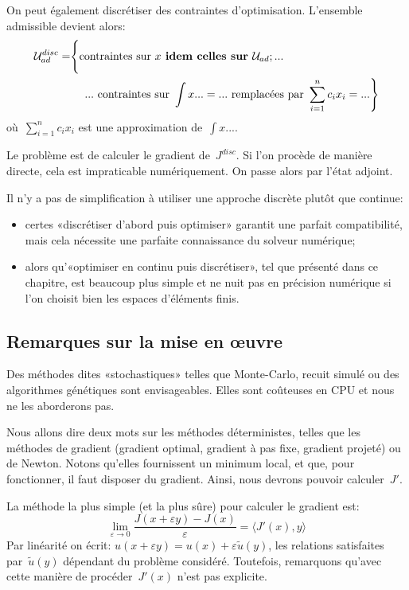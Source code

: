 On peut également discrétiser des contraintes d'optimisation. L'ensemble admissible devient alors:
\begin{equation}
\begin{split} 
\mathcal{U}^{disc}_{ad} = &\Bigg\{ \text{contraintes sur } x \textbf{ idem celles sur } \mathcal{U}_{ad}; ...\\  
& \left. \quad ... \text{ contraintes sur } \int x...=... \text{ remplacées par } \displaystyle\sum_{i=1}^n c_ix_i = ... \right\}
\end{split}
\end{equation}
où~$\sum_{i=1}^n c_ix_i$ est une approximation de~$\int x...$.

Le problème est de calculer le gradient de~$J^{disc}$. Si l'on procède de manière directe, cela est impraticable numériquement. On passe alors par l'état adjoint.

\medskip
Il n'y a pas de simplification à utiliser une approche discrète plutôt que continue:
\begin{itemize}
   \item certes «discrétiser d'abord puis optimiser» garantit une parfait compatibilité, mais cela nécessite une parfaite connaissance du solveur numérique;
   \item alors qu'«optimiser en continu puis discrétiser», tel que présenté dans ce chapitre, est beaucoup plus simple et ne nuit pas en précision numérique si l'on choisit bien les espaces d'éléments finis.
\end{itemize}


\medskip
\subsection{Remarques sur la mise en œuvre}

Des méthodes dites «stochastiques» telles que Monte-Carlo, recuit simulé ou des algorithmes génétiques sont envisageables. Elles sont coûteuses en CPU et nous ne les aborderons pas.

Nous allons dire deux mots sur les méthodes déterministes, telles que les méthodes de gradient (gradient optimal, gradient à pas fixe, gradient projeté) ou de Newton. Notons qu'elles fournissent un minimum local, et que, pour fonctionner, il faut disposer du gradient. Ainsi, nous devrons pouvoir calculer~$J'$.

\medskip
La méthode la plus simple (et la plus sûre) pour calculer le gradient est:
\begin{equation}
\lim_{\varepsilon\rightarrow0} \dfrac{J(x+\varepsilon y)-J(x)}{\varepsilon}
=\langle J'(x),y\rangle %
\end{equation}
Par linéarité on écrit: $u(x+\varepsilon y)=u(x)+\varepsilon \tilde{u}(y)$, les relations satisfaites par~$\tilde{u}(y)$ dépendant du problème considéré.
Toutefois, remarquons qu'avec cette manière de procéder~$J'(x)$ n'est pas explicite.

